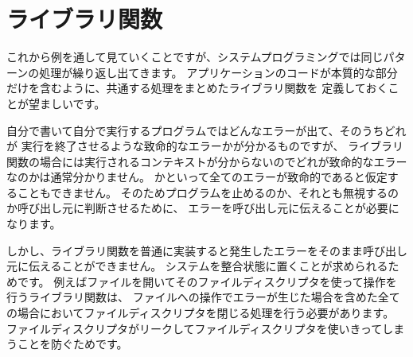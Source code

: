 \section{ライブラリ関数}

これから例を通して見ていくことですが、システムプログラミングでは同じパターンの処理が繰り返し出てきます。
アプリケーションのコードが本質的な部分だけを含むように、共通する処理をまとめたライブラリ関数を
定義しておくことが望ましいです。

自分で書いて自分で実行するプログラムではどんなエラーが出て、そのうちどれが
実行を終了させるような致命的なエラーかが分かるものですが、
ライブラリ関数の場合には実行されるコンテキストが分からないのでどれが致命的なエラーなのかは通常分かりません。
かといって全てのエラーが致命的であると仮定することもできません。
そのためプログラムを止めるのか、それとも無視するのか呼び出し元に判断させるために、
エラーを呼び出し元に伝えることが必要になります。

しかし、ライブラリ関数を普通に実装すると発生したエラーをそのまま呼び出し元に伝えることができません。
システムを整合状態に置くことが求められるためです。
例えばファイルを開いてそのファイルディスクリプタを使って操作を行うライブラリ関数は、
ファイルへの操作でエラーが生じた場合を含めた全ての場合においてファイルディスクリプタを閉じる処理を行う必要があります。
ファイルディスクリプタがリークしてファイルディスクリプタを使いきってしまうことを防ぐためです。

